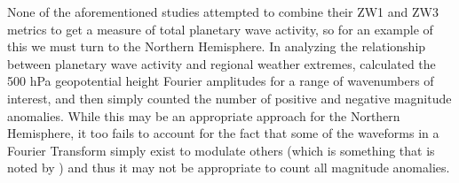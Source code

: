 None of the aforementioned studies attempted to combine their ZW1 and ZW3 metrics to get a measure of total planetary wave activity, so for an example of this we must turn to the Northern Hemisphere. In analyzing the relationship between planetary wave activity and regional weather extremes, \citet{Screen2014} calculated the 500 hPa geopotential height Fourier amplitudes for a range of wavenumbers of interest, and then simply counted the number of positive and negative magnitude anomalies. While this may be an appropriate approach for the Northern Hemisphere, it too fails to account for the fact that some of the waveforms in a Fourier Transform simply exist to modulate others (which is something that is noted by \citet{Screen2014}) and thus it may not be appropriate to count all magnitude anomalies.  